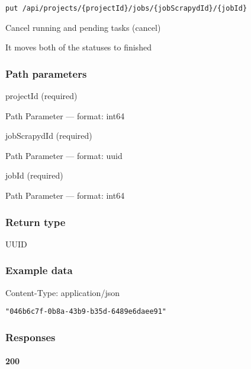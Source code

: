 \protect\hypertarget{cancel}{}{}



\begin{verbatim}
put /api/projects/{projectId}/jobs/{jobScrapydId}/{jobId}
\end{verbatim}

Cancel running and pending tasks ({cancel})

It moves both of the statuses to finished

\hypertarget{path-parameters-5}{%
\subsubsection*{Path parameters}\label{path-parameters-5}}

projectId (required)

{Path Parameter} --- format: int64

jobScrapydId (required)

{Path Parameter} --- format: uuid

jobId (required)

{Path Parameter} --- format: int64

\hypertarget{return-type-7}{%
\subsubsection*{Return type}\label{return-type-7}}

UUID

\hypertarget{example-data-7}{%
\subsubsection*{Example data}\label{example-data-7}}

Content-Type: application/json

\begin{verbatim}
"046b6c7f-0b8a-43b9-b35d-6489e6daee91"
\end{verbatim}

\hypertarget{responses-7}{%
\subsubsection*{Responses}\label{responses-7}}

\hypertarget{section-24}{%
\paragraph{200}\label{section-24}}

